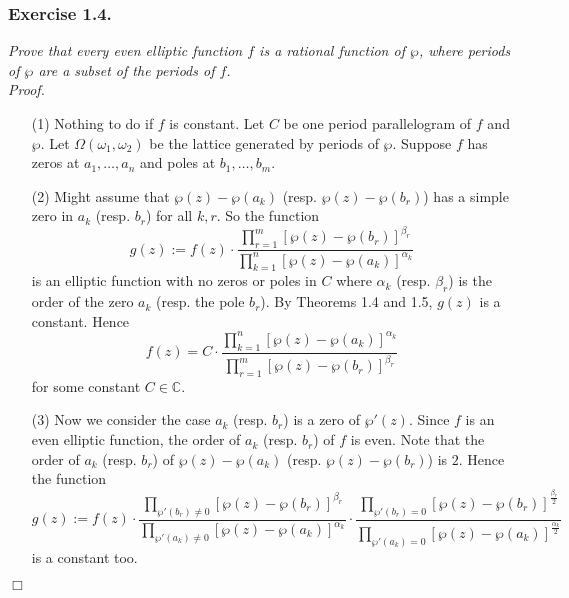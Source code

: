 \documentclass{article}
\begin{document}



\subsubsection*{Exercise 1.4.}
\emph{Prove that every even elliptic function $f$ is a rational function of $\wp$,
where periods of $\wp$ are a subset of the periods of $f$.} \\



\emph{Proof.}
\begin{enumerate}
\item[(1)]
  Nothing to do if $f$ is constant.
  Let $C$ be one period parallelogram of $f$ and $\wp$.
  Let $\Omega(\omega_1,\omega_2)$ be the lattice generated by periods of $\wp$.
  Suppose $f$ has zeros at $a_1, \ldots, a_n$ and poles at $b_1, \ldots, b_m$.

\item[(2)]
  Might assume that
  $\wp(z) - \wp(a_k)$ (resp. $\wp(z) - \wp(b_r)$) has a simple zero in $a_k$ (resp. $b_r$)
  for all $k, r$.
  So the function
  \[
    g(z)
    :=
    f(z)
    \cdot
    \frac{\prod_{r=1}^{m}[\wp(z)-\wp(b_r)]^{\beta_r}}{\prod_{k=1}^{n}[\wp(z)-\wp(a_k)]^{\alpha_k}}
  \]
  is an elliptic function with no zeros or poles in $C$
  where $\alpha_k$ (resp. $\beta_r$) is the order of the zero $a_k$ (resp. the pole $b_r$).
  By Theorems 1.4 and 1.5, $g(z)$ is a constant.
  Hence
  \[
    f(z)
    =
    C \cdot
    \frac{\prod_{k=1}^{n}[\wp(z)-\wp(a_k)]^{\alpha_k}}{\prod_{r=1}^{m}[\wp(z)-\wp(b_r)]^{\beta_r}}
  \]
  for some constant $C \in \mathbb{C}$.

\item[(3)]
  Now we consider the case $a_k$ (resp. $b_r$) is a zero of $\wp'(z)$.
  Since $f$ is an even elliptic function, the order of $a_k$ (resp. $b_r$) of $f$ is even.
  Note that the order of $a_k$ (resp. $b_r$) of $\wp(z)-\wp(a_k)$ (resp. $\wp(z)-\wp(b_r)$) is $2$.
  Hence the function
  \[
    g(z)
    :=
    f(z)
    \cdot
    \frac{\prod_{\wp'(b_r) \neq 0}[\wp(z)-\wp(b_r)]^{\beta_r}}
      {\prod_{\wp'(a_k) \neq 0}[\wp(z)-\wp(a_k)]^{\alpha_k}}
    \cdot
    \frac{\prod_{\wp'(b_r) = 0}[\wp(z)-\wp(b_r)]^{\frac{\beta_r}{2}}}
      {\prod_{\wp'(a_k) = 0}[\wp(z)-\wp(a_k)]^{\frac{\alpha_k}{2}}}
  \]
  is a constant too.
\end{enumerate}
$\Box$ \\
\end{document}
